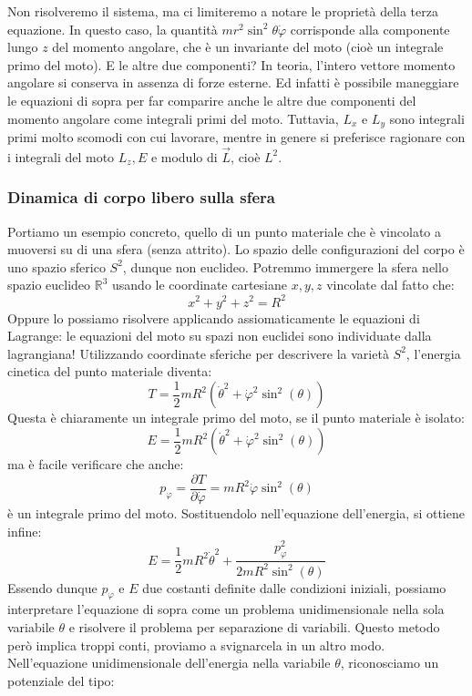 \documentclass[a4paper,openany]{article}
\begin{document}
	Non risolveremo il sistema, ma ci limiteremo a notare le proprietà della terza equazione. In questo caso, la quantità $mr^{2}\sin^{2}\theta\dot{\varphi}$ corrisponde alla componente lungo $z$ del momento angolare, che è un invariante del moto (cioè un integrale primo del moto). E le altre due componenti? In teoria, l'intero vettore momento angolare si conserva in assenza di forze esterne. Ed infatti è possibile maneggiare le equazioni di sopra per far comparire anche le altre due componenti del momento angolare come integrali primi del moto. Tuttavia, $L_{x} \mbox{ e } L_{y}$ sono integrali primi molto scomodi con cui lavorare, mentre in genere si preferisce ragionare con i integrali del moto $L_{z}, E$ e modulo di $\vec{L}$, cioè $L^{2}$.
	\subsubsection{Dinamica di corpo libero sulla sfera}
	Portiamo un esempio concreto, quello di un punto materiale che è vincolato a muoversi su di una sfera (senza attrito).
	Lo spazio delle configurazioni del corpo è uno spazio sferico $S^2$, dunque non euclideo. Potremmo immergere la sfera nello spazio euclideo $\mathbb{R}^3$ usando le coordinate cartesiane $x,y,z$ vincolate dal fatto che:
	$$
	x^2+y^2+z^2 = R^2
	$$
	Oppure lo possiamo risolvere applicando assiomaticamente le equazioni di Lagrange: le equazioni del moto su spazi non euclidei sono individuate dalla lagrangiana!
	Utilizzando coordinate sferiche per descrivere la varietà $S^2$, l'energia cinetica del punto materiale diventa:
	$$
	T = \dfrac{1}{2}mR^{2}(\dot{\theta}^{2}+\dot{\varphi}^{2}\sin^{2}(\theta))
	$$
	Questa è chiaramente un integrale primo del moto, se il punto materiale è isolato:
	$$
	E = \dfrac{1}{2}mR^{2}(\dot{\theta}^{2}+\dot{\varphi}^{2}\sin^{2}(\theta))
	$$
	ma è facile verificare che anche:
	$$
	p_{\varphi}= \dfrac{\partial T}{\partial \dot{\varphi}} = mR^{2}\dot{\varphi}\sin^{2}(\theta)
	$$
	è un integrale primo del moto. Sostituendolo nell'equazione dell'energia, si ottiene infine:
	$$
	E = \dfrac{1}{2}mR^{2}\dot{\theta}^{2}+\dfrac{p_{\varphi}^{2}}{2mR^{2}\sin^{2}(\theta)}
	$$
	Essendo dunque $p_{\varphi} \mbox{ e } E$ due costanti definite dalle condizioni iniziali, possiamo interpretare l'equazione di sopra come un problema unidimensionale nella sola variabile $\theta$ e risolvere il problema per separazione di variabili. Questo metodo però implica troppi conti, proviamo a svignarcela in un altro modo. Nell'equazione unidimensionale dell'energia nella variabile $\theta$, riconosciamo un potenziale del tipo:
\end{document}
